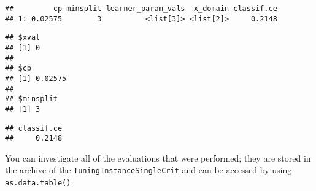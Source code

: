 \documentclass[
]{scrbook}
\newenvironment{Shaded}{\begin{snugshade}}{\end{snugshade}}
\newcommand{\FunctionTok}[1]{\textcolor[rgb]{0.00,0.00,0.00}{#1}}
\newcommand{\NormalTok}[1]{#1}
\newcommand{\SpecialCharTok}[1]{\textcolor[rgb]{0.00,0.00,0.00}{#1}}
\renewenvironment{Shaded} {\begin{snugshade}\small} {\end{snugshade}}
\begin{document}
\begin{verbatim}
##         cp minsplit learner_param_vals  x_domain classif.ce
## 1: 0.02575        3          <list[3]> <list[2]>     0.2148
\end{verbatim}

\begin{Shaded}
\end{Shaded}

\begin{verbatim}
## $xval
## [1] 0
## 
## $cp
## [1] 0.02575
## 
## $minsplit
## [1] 3
\end{verbatim}

\begin{Shaded}
\end{Shaded}

\begin{verbatim}
## classif.ce 
##     0.2148
\end{verbatim}

You can investigate all of the evaluations that were performed; they are stored in the archive of the \href{https://mlr3tuning.mlr-org.com/reference/TuningInstanceSingleCrit.html}{\texttt{TuningInstanceSingleCrit}} and can be accessed by using \texttt{as.data.table()}:

\begin{Shaded}
\end{Shaded}
\end{document}
